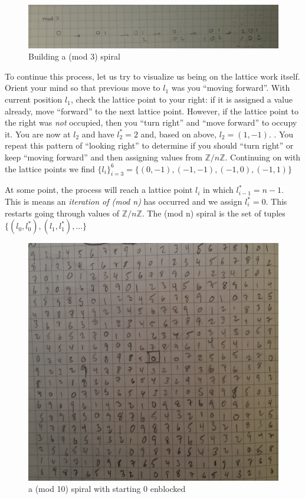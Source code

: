 \documentclass[11pt]{amsart}
\theoremstyle{mydef}
\begin{document}
\begin{figure}[h]
\centering
\includegraphics[scale=0.3]{mod3basic.png}
\caption{Building a (mod 3) spiral}
\label{fig:mod3spiral}
\end{figure}

To continue this process, let us try to visualize us being on the lattice work itself. Orient your mind so that previous move to $l_1$ was you ``moving forward''. With current position $l_1$, check the lattice point to your right: if it is assigned a value already, move ``forward'' to the next lattice point. However, if the lattice point to the right was \emph{not} occupied, then you ``turn right'' and ``move forward'' to occupy it. You are now at $l_2$ and have $l^*_2 = 2$ and, based on above, $l_2 = (1, -1)$. . You repeat this pattern of ``looking right'' to determine if you should ``turn right'' or keep ``moving forward'' and then assigning values from $\mathbb{Z}/n\mathbb{Z}$. Continuing on with the lattice points we find $\{ l_i \}^{6}_{i=3} = \{  (0, -1), (-1, -1), (-1, 0), (-1, 1) \}$

At some point, the process will reach a lattice point $l_i$ in which $l^*_{i-1} = n-1$. This is means an \textit{iteration of (mod n)} has occurred and we assign $l^*_i = 0$. This restarts going through values of $\mathbb{Z}/n\mathbb{Z}$. The (mod n) spiral is the set of tuples $\{ (l_0, l^*_0), (l_1, l^*_1), ... \}$ 





\begin{figure}[h]
\centering
\includegraphics[scale=0.3]{mod10.png}
\caption{a (mod 10) spiral with starting 0 enblocked}
\label{fig:mod10}
\end{figure}
\end{document}
